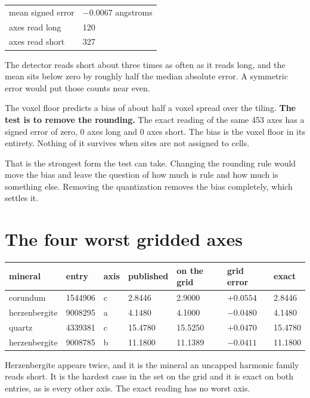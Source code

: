 \begin{longtable}{@{}p{}p{}@{}}
\toprule
\endhead
mean signed error & $-0.0067$ angstroms \\
axes read long & 120 \\
axes read short & 327 \\
\bottomrule
\end{longtable}

The detector reads short about three times as often as it reads long, and the mean sits below zero by roughly half the median absolute error. A symmetric error would put those counts near even.

The voxel floor predicts a bias of about half a voxel spread over the tiling. \textbf{The test is to remove the rounding.} The exact reading of the same 453 axes has a signed error of zero, 0 axes long and 0 axes short. The bias is the voxel floor in its entirety. Nothing of it survives when sites are not assigned to cells.

That is the strongest form the test can take. Changing the rounding rule would move the bias and leave the question of how much is rule and how much is something else. Removing the quantization removes the bias completely, which settles it.

\section{The four worst gridded axes}

\begin{longtable}{@{}p{}p{}p{}p{}p{}p{}p{}@{}}
\toprule
mineral & entry & axis & published & on the grid & grid error & exact \\
\midrule
\endhead
corundum & 1544906 & c & 2.8446 & 2.9000 & $+0.0554$ & 2.8446 \\
herzenbergite & 9008295 & a & 4.1480 & 4.1000 & $-0.0480$ & 4.1480 \\
quartz & 4339381 & c & 15.4780 & 15.5250 & $+0.0470$ & 15.4780 \\
herzenbergite & 9008785 & b & 11.1800 & 11.1389 & $-0.0411$ & 11.1800 \\
\bottomrule
\end{longtable}

Herzenbergite appears twice, and it is the mineral an uncapped harmonic family reads short. It is the hardest case in the set on the grid and it is exact on both entries, as is every other axis. The exact reading has no worst axis.


